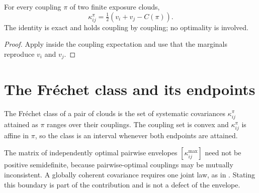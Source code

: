 
\begin{lemma}
  \label{lem:transport-polarization}
  For every coupling \(\pi\) of two finite exposure clouds,
  \[
    \kappa^\pi_{ij}=\tfrac12\left(v_i+v_j-C(\pi)\right).
  \]
  The identity is exact and holds coupling by coupling; no optimality is
  involved.
\end{lemma}

\begin{proof}
  Apply  inside the coupling expectation and use that
  the marginals reproduce \(v_i\) and \(v_j\).
\end{proof}

\section{The Fréchet class and its endpoints}

\begin{definition}
  \label{def:frechet-class}
  The Fréchet class of a pair of clouds is the set of systematic covariances
  \(\kappa^\pi_{ij}\) attained as \(\pi\) ranges over their couplings.
  The coupling set is convex and \(\kappa^\pi_{ij}\) is affine in \(\pi\), so
  the class is an interval whenever both endpoints are attained.
\end{definition}





\begin{proposition}
  \label{prop:pairwise-not-psd}
  \notready
  The matrix of independently optimal pairwise envelopes
  \(\left[\kappa^{\max}_{ij}\right]\) need not be positive semidefinite,
  because pairwise-optimal couplings may be mutually inconsistent.
  A globally coherent covariance requires one joint law, as in
  .
  Stating this boundary is part of the contribution and is not a defect of the
  envelope.
\end{proposition}

